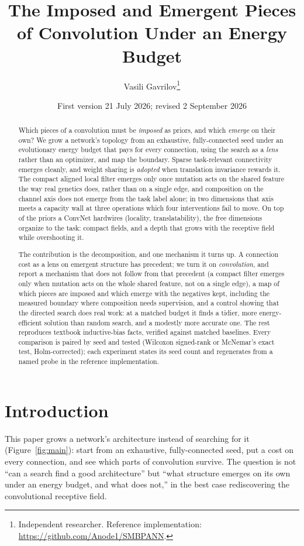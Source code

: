 \documentclass[11pt]{article}
\title{\textbf{The Imposed and Emergent Pieces of Convolution Under an Energy Budget}}
\author{Vasili Gavrilov\thanks{Independent researcher. Reference implementation:
\url{https://github.com/Anode1/SMBPANN}.}}
\date{First version 21 July 2026; revised 2 September 2026}
\begin{document}
\maketitle

\begin{abstract}
Which pieces of a convolution must be \emph{imposed} as priors, and which \emph{emerge} on their own? We
grow a network's topology from an exhaustive, fully-connected seed under an evolutionary energy budget that
pays for every connection, using the search as a \emph{lens} rather than an optimizer, and map the
boundary. Sparse task-relevant connectivity emerges cleanly, and weight sharing is \emph{adopted} when
translation invariance rewards it. The compact aligned local filter emerges only once mutation acts on the
shared feature the way real genetics does, rather than on a single edge, and composition on the channel
axis does not emerge from the task label alone; in two dimensions that axis meets a capacity wall at
three operations which four interventions fail to move. On top of the priors a ConvNet hardwires (locality,
translatability), the free dimensions organize to the task: compact fields, and a depth that grows with
the receptive field while overshooting it.

The contribution is the decomposition, and one mechanism it turns up. A connection cost as a lens on
emergent structure has precedent; we turn it on \emph{convolution}, and report a mechanism that does not
follow from that precedent (a compact filter emerges only when mutation acts on the whole shared feature,
not on a single edge), a map of which pieces are imposed and which emerge with the negatives kept,
including the measured boundary where composition needs supervision, and a control showing that the
directed search does real work: at a matched budget it finds a tidier, more energy-efficient solution than
random search, and a modestly more accurate one. The rest reproduces textbook inductive-bias facts,
verified against matched baselines. Every comparison is paired by seed and tested (Wilcoxon signed-rank or McNemar's exact test,
Holm-corrected); each experiment states its seed count and regenerates from a named probe in the
reference implementation.
\end{abstract}

\section{Introduction}

This paper grows a network's architecture instead of searching for it (Figure~\ref{fig:main}): start from
an exhaustive, fully-connected seed, put a cost on every connection, and see which parts of convolution
survive. The question is not ``can a search find a good architecture'' but ``what structure emerges on its
own under an energy budget, and what does not,'' in the best case rediscovering the convolutional
receptive field.
\end{document}
